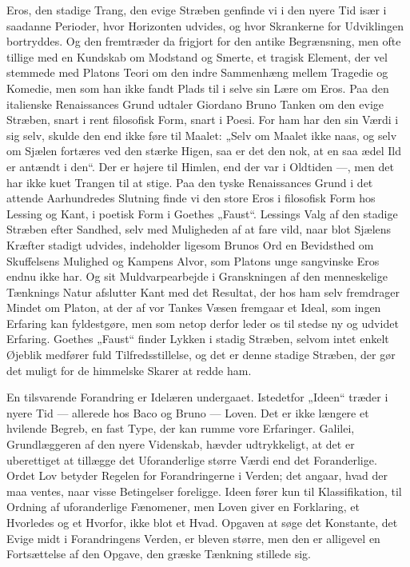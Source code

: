 \documentclass[12pt,a4paper,openany]{book}
\newcommand{\opage}[1]{\marginnote{\footnotesize\textit{[#1]}}}
\begin{document}
Eros, den stadige Trang, den evige Stræben genfinde vi i den
nyere Tid især i saadanne Perioder, hvor Horizonten udvides,
og hvor Skrankerne for Udviklingen bortryddes. Og den fremtræder
da frigjort for den antike Begrænsning, men ofte tillige med
en Kundskab om Modstand og Smerte, et tragisk Element, der
vel stemmede med Platons Teori om den indre Sammenhæng
mellem Tragedie og Komedie, men som han ikke fandt Plads til
i selve sin Lære om Eros. Paa den italienske Renaissances Grund
udtaler Giordano Bruno Tanken om den evige Stræben, snart i
rent filosofisk Form, snart i Poesi. For ham har den sin Værdi
i sig selv, skulde den end ikke føre til Maalet: „Selv om Maalet
ikke naas, og selv om Sjælen fortæres ved den stærke Higen,
saa er det den nok, at en saa ædel Ild er antændt i den“. Der
er højere til Himlen, end der var i Oldtiden ---, men det har
ikke kuet Trangen til at stige. Paa den tyske Renaissances Grund
i det attende Aarhundredes Slutning finde vi den store Eros i
filosofisk Form hos Lessing og Kant, i poetisk Form i Goethes
„Faust“. Lessings Valg af den stadige Stræben efter Sandhed, selv
med Muligheden af at fare vild, naar blot Sjælens Kræfter stadigt
udvides, indeholder ligesom Brunos Ord en Bevidsthed om Skuffelsens
Mulighed og Kampens Alvor, som Platons unge sangvinske
Eros endnu ikke har. Og sit Muldvarpearbejde i Granskningen
af den menneskelige Tænknings Natur afslutter Kant med
det Resultat, der hos ham selv fremdrager Mindet om Platon, at
der af vor Tankes Væsen fremgaar et Ideal, som ingen Erfaring
\setcounter{footnote}{0}%
\opage{91}kan fyldestgøre, men som netop derfor leder os til stedse ny
og udvidet Erfaring. Goethes „Faust“ finder Lykken i stadig
Stræben, selvom intet enkelt Øjeblik medfører fuld Tilfredsstillelse,
og det er denne stadige Stræben, der gør det muligt
for de himmelske Skarer at redde ham.

En tilsvarende Forandring er Idelæren undergaaet. Istedetfor
„Ideen“ træder i nyere Tid --- allerede hos Baco og Bruno
--- Loven. Det er ikke længere et hvilende Begreb, en fast Type,
der kan rumme vore Erfaringer. Galilei, Grundlæggeren af den
nyere Videnskab, hævder udtrykkeligt, at det er uberettiget at
tillægge det Uforanderlige større Værdi end det Foranderlige.
Ordet Lov betyder Regelen for Forandringerne i Verden; det
angaar, hvad der maa ventes, naar visse Betingelser foreligge.
Ideen fører kun til Klassifikation, til Ordning af uforanderlige
Fænomener, men Loven giver en Forklaring, et Hvorledes og
et Hvorfor, ikke blot et Hvad. Opgaven at søge det Konstante,
det Evige midt i Forandringens Verden, er bleven større, men
den er alligevel en Fortsættelse af den Opgave, den græske
Tænkning stillede sig.
\end{document}
